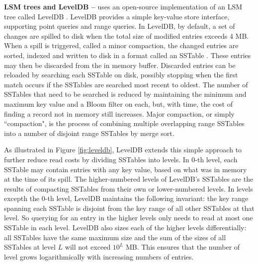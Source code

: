 \textbf{LSM trees and LevelDB --}
\tfs uses an open-source implementation of an LSM tree called LevelDB
\cite{LevelDB}. LevelDB provides a simple key-value store interface,
supporting point queries and range queries. In LevelDB, by default,
a set of changes are spilled to disk when the total size of modified
entries exceeds 4 MB.  When a spill is triggered, called a
minor compaction, the changed entries are sorted, indexed and written to disk
in a format called an SSTable \cite{BigTable}.  These entries may then be
discarded from the in memory buffer. Discarded entries
can be reloaded by searching each SSTable
on disk, possibly stopping when the first match occurs if the SSTables are
searched most recent to oldest.  The number of SSTables that need to be
searched is reduced by maintaining the minimum and maximum key value
and a Bloom filter\cite{bloomfilter} on each,
but, with time, the cost of finding a record not in memory still increases.
Major compaction, or simply ``compaction",
is the process of combining multiple overlapping range SSTables
into a number of disjoint range SSTables by merge sort.

As illustrated in Figure \ref{fig:leveldb},
LevelDB extends this simple approach to further
reduce read costs by dividing SSTables into levels.
In 0-th level, each SSTable may contain entries with any key value,
based on what was in memory at the time of its spill.
The higher-numbered levels of LevelDB's SSTables are
the results of compacting SSTables from their own or lower-numbered levels.
In levels excepth the 0-th level, LevelDB maintains the following invariant:
the key range spanning each SSTable is disjoint from
the key range of all other SSTables at that level.
So querying for an entry in the higher levels
only needs to read at most one SSTable in each level.
LevelDB also sizes each of the higher levels differentially:
all SSTables have the same maximum size and
the sum of the sizes of all SSTables at level $L$ will not exceed $10^L$ MB.
This ensures that the number of level grows
logarithmically with increasing numbers of entries.

